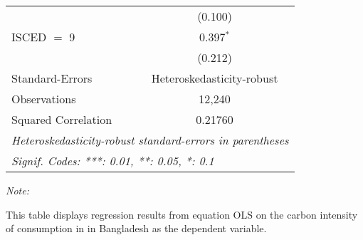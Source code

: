 \begin{table}[htbp!]
\begin{adjustbox}{width = 1\textwidth, max height = 0.95\textheight, center}
\begin{threeparttable}[b]
\begin{tabular}{lc}
                                & (0.100)\\   
            ISCED $=$ 9         & 0.397$^{*}$\\   
                                & (0.212)\\   
            \midrule 
            Standard-Errors     & Heteroskedasticity-robust \\   
            Observations        & 12,240\\  
            Squared Correlation & 0.21760\\  
            \midrule \midrule
            \multicolumn{2}{l}{\emph{Heteroskedasticity-robust standard-errors in parentheses}}\\
            \multicolumn{2}{l}{\emph{Signif. Codes: ***: 0.01, **: 0.05, *: 0.1}}\\
         \end{tabular}
         
         \begin{tablenotes}\item \medskip \textit{Note:}
            \item This table displays regression results from equation OLS on the carbon intensity of consumption in  in Bangladesh as the dependent variable. 
         \end{tablenotes}
      \end{threeparttable}
   \end{adjustbox}
\end{table}


